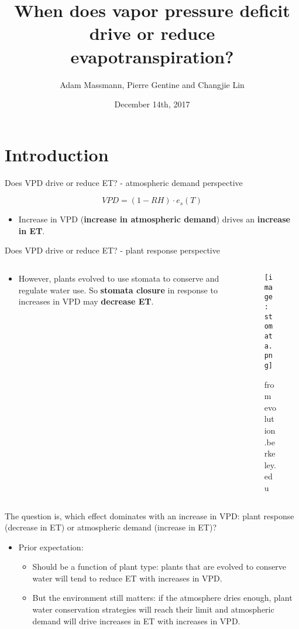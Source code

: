 \documentclass[aspectratio=169]{beamer}
\title[Your Short Title]{When does vapor pressure deficit drive or reduce evapotranspiration?}
\author{Adam Massmann,  Pierre Gentine and Changjie Lin}
\institute{AGU Fall Meeting}
\date{December 14th, 2017}
\begin{document}
\begin{frame}
  \titlepage
\end{frame}


\section{Introduction}
\begin{frame}{Does VPD drive or reduce ET? - atmospheric demand perspective}
  \begin{Huge}
  \[VPD = (1-RH)\cdot e_s (T)\]
\end{Huge}
  \begin{itemize}
  \item Increase in VPD (\textbf{increase in atmospheric demand}) drives  an \textbf{increase in ET}.
  \end{itemize}
\end{frame}

\begin{frame}{Does VPD drive or reduce ET? - plant response perspective}
  \begin{columns}
    \begin{column}{0.5\textwidth}
      \begin{itemize}
      \item However, plants evolved to use stomata to conserve and regulate water use. So \textbf{stomata closure} in response to increases in VPD may \textbf{decrease ET}.
      \end{itemize}
    \end{column}
    \begin{column}{0.5\textwidth}
      \begin{figure}
        \texttt{[image: stomata.png]}%
        \caption{from evolution.berkeley.edu}
      \end{figure}
    \end{column}
  \end{columns}
\end{frame}


\begin{frame}{The question is, which effect dominates with an increase in VPD: plant response (decrease in ET) or atmospheric demand (increase in ET)?}
  \begin{itemize}
  \item Prior expectation:
    \begin{itemize}
    \item Should be a function of plant type: plants that are evolved to conserve water will tend to reduce ET with increases in VPD.
    \item But the environment still matters: if the atmosphere dries enough, plant water conservation strategies will reach their limit and atmospheric demand will drive increases in ET with increases in VPD.
    \end{itemize}
  \end{itemize}
\end{frame}
\end{document}
